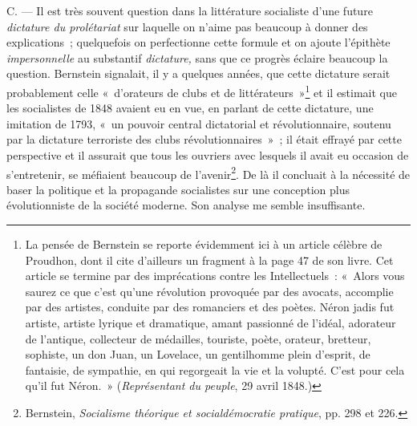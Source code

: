 \documentclass[french,twoside]{book} %
\begin{document}
\noindent C. — Il est très souvent question dans la littérature socialiste d’une future \emph{dictature du prolétariat} sur laquelle on n’aime pas beaucoup à donner des explications ; quelquefois on perfectionne cette formule et on ajoute l’épithète \emph{impersonnelle} au substantif \emph{dictature,} sans que ce progrès éclaire beaucoup la question. Bernstein signalait, il y a quelques années, que cette dictature serait probablement celle « d’orateurs de clubs et de littérateurs »\footnote{ \noindent La pensée de Bernstein se reporte évidemment ici à un article célèbre de Proudhon, dont il cite d’ailleurs un fragment à la page 47 de son livre. Cet article se termine par des imprécations contre les Intellectuels : « Alors vous saurez ce que c’est qu’une révolution provoquée par des avocats, accomplie par des artistes, conduite par des romanciers et des poètes. Néron jadis fut artiste, artiste lyrique et dramatique, amant passionné de l’idéal, adorateur de l’antique, collecteur de médailles, touriste, poète, orateur, bretteur, sophiste, un don Juan, un Lovelace, un gentilhomme plein d’esprit, de fantaisie, de sympathie, en qui regorgeait la vie et la volupté. C’est pour cela qu’il fut Néron. » (\emph{Représentant du peuple}, 29 avril 1848.)
 } et il estimait que les socialistes de 1848  avaient eu en vue, en parlant de cette dictature, une imitation de 1793, « un pouvoir central dictatorial et révolutionnaire, soutenu par la dictature terroriste des clubs révolutionnaires » ; il était effrayé par cette perspective et il assurait que tous les ouvriers avec lesquels il avait eu occasion de s’entretenir, se méfiaient beaucoup de l’avenir\footnote{ \noindent Bernstein, \emph{Socialisme théorique et socialdémocratie pratique}, pp. 298 et 226.
 }. De là il concluait à la nécessité de baser la politique et la propagande socialistes sur une conception plus évolutionniste de la société moderne. Son analyse me semble insuffisante.\par
\end{document}
